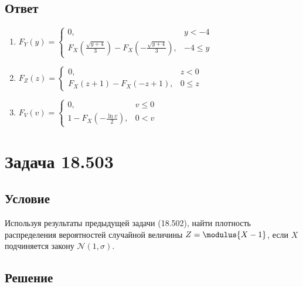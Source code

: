\subsection*{Ответ}
\begin{enumerate}
    \item $F_Y(y)
    = \left \{
    \begin{array}{ll}
        0,                                                                                           & y < -4    \\
        F_X \left ( \frac{\sqrt{y + 4}}{3} \right ) - F_X \left ( - \frac{\sqrt{y + 4}}{3} \right ), & -4 \leq y
    \end{array}
    \right .
    $
    \item $F_Z(z)
    = \left \{
    \begin{array}{ll}
        0,                        & z < 0    \\
        F_X(z + 1) - F_X(-z + 1), & 0 \leq z
    \end{array}
    \right .
    $
    \item $
    F_V(v)
    = \left \{
    \begin{array}{ll}
        0,                                         & v \leq 0 \\
        1 - F_X \left ( -\frac{\ln v}{2} \right ), & 0 < v
    \end{array}
    \right .
    $
\end{enumerate}


\section*{Задача 18.503}

\subsection*{Условие}
Используя результаты предыдущей задачи (18.502), найти плотность распределения вероятностей случайной величины $Z=\modulus{X-1}$, если $X$ подчиняется закону
$\mathcal{N}(1,\sigma)$.

\subsection*{Решение}

